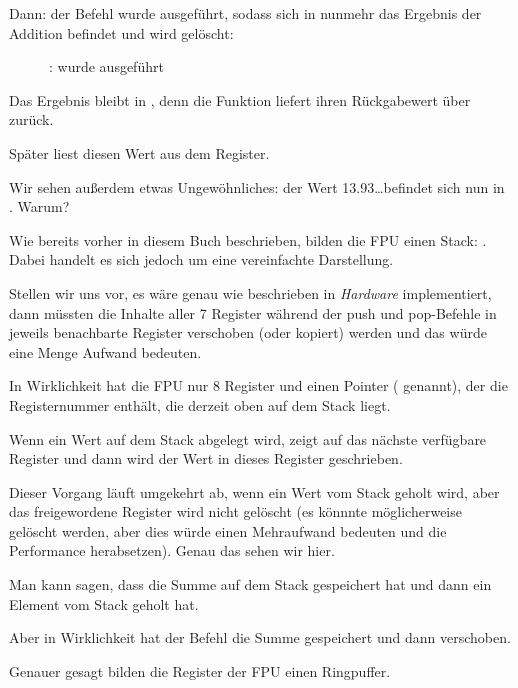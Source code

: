 \clearpage
Dann: der Befehl \FADDP wurde ausgeführt, sodass sich in  nunmehr das
Ergebnis der Addition befindet und  wird gelöscht:

\begin{figure}[H]
\centering
{}
\caption{\olly: \FADDP wurde ausgeführt}
\label{fig:FPU_simple_olly_5}
\end{figure}
Das Ergebnis bleibt in , denn die Funktion liefert ihren Rückgabewert über
 zurück.

Später liest \main diesen Wert aus dem Register.

Wir sehen außerdem etwas Ungewöhnliches: der Wert 13.93\ldots befindet sich nun
in . Warum?

\label{FPU_is_rather_circular_buffer}
Wie bereits vorher in diesem Buch beschrieben, bilden die \ac{FPU} einen Stack:
. Dabei handelt es sich jedoch um eine vereinfachte
Darstellung.

Stellen wir uns vor, es wäre genau wie beschrieben in \emph{Hardware}
implementiert, dann müssten die Inhalte aller 7 Register während der push und
pop-Befehle in jeweils benachbarte Register verschoben (oder kopiert) werden und
das würde eine Menge Aufwand bedeuten.

In Wirklichkeit hat die \ac{FPU} nur 8 Register und einen Pointer (
genannt), der die Registernummer enthält, die derzeit oben auf dem Stack liegt.

Wenn ein Wert auf dem Stack abgelegt wird, zeigt  auf das nächste
verfügbare Register und dann wird der Wert in dieses Register geschrieben.

Dieser Vorgang läuft umgekehrt ab, wenn ein Wert vom Stack geholt wird, aber das
freigewordene Register wird nicht gelöscht (es könnnte möglicherweise gelöscht
werden, aber dies würde einen Mehraufwand bedeuten und die Performance
herabsetzen). 
Genau das sehen wir hier.

Man kann sagen, dass \FADDP die Summe auf dem Stack gespeichert hat und dann ein
Element vom Stack geholt hat.

Aber in Wirklichkeit hat der Befehl die Summe gespeichert und dann 
verschoben.

Genauer gesagt bilden die Register der \ac{FPU} einen Ringpuffer. 
